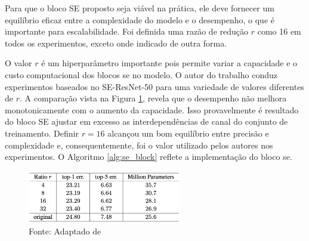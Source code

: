 Para que o bloco SE proposto seja viável na prática, ele deve fornecer um equilíbrio eficaz entre a complexidade do modelo e o desempenho, o que é importante para escalabilidade. Foi definida uma razão de redução $r$ como 16 em todos os experimentos, exceto onde indicado de outra forma. 

O valor $r$ é um hiperparâmetro importante pois permite variar a capacidade e o custo computacional dos blocos \gls{se} no modelo. O autor do trabalho conduz experimentos baseados no SE-ResNet-50 para uma variedade de valores diferentes de $r$. A comparação vista na Figura  \ref{fig:fig027}, revela que o desempenho não melhora monotonicamente com o aumento da capacidade. Isso provavelmente é resultado do bloco SE ajustar em excesso as interdependências de canal do conjunto de treinamento. Definir $r = 16$ alcançou um bom equilíbrio entre precisão e complexidade e, consequentemente, foi o valor utilizado pelos autores nos experimentos. O Algoritmo \ref{alg:se_block} reflete a implementação do bloco \gls{se}.

\begin{figure}[h!]
    \centering
    \caption{Desempenho da SE-ResNet-50 com diferentes valores do fator de redução $r$, demonstrando variação nos erros top-1 e top-5 e no número de parâmetros, em comparação com a arquitetura ResNet-50 original.}
    \includegraphics[width=0.6\textwidth]{figures/fig027.png}
    \caption*{Fonte: Adaptado de \cite{huSqueezeandExcitationNetworks2018}}
    \label{fig:fig027}
\end{figure}


